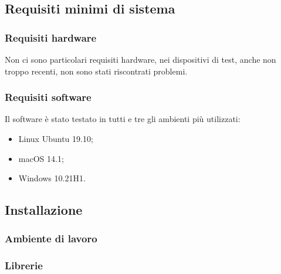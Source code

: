 \subsection{Requisiti minimi di sistema}

	\subsubsection{Requisiti hardware}
	Non ci sono particolari requisiti hardware, nei dispositivi di test, anche non troppo recenti, non sono stati riscontrati problemi.
	
	\subsubsection{Requisiti software}
	Il software è stato testato in tutti e tre gli ambienti più utilizzati:
	\begin{itemize}
		\item Linux Ubuntu 19.10;
		\item macOS 14.1;
		\item Windows 10.21H1.
	\end{itemize}  
	
\subsection{Installazione}

	\subsubsection{Ambiente di lavoro}

	\subsubsection{Librerie}
